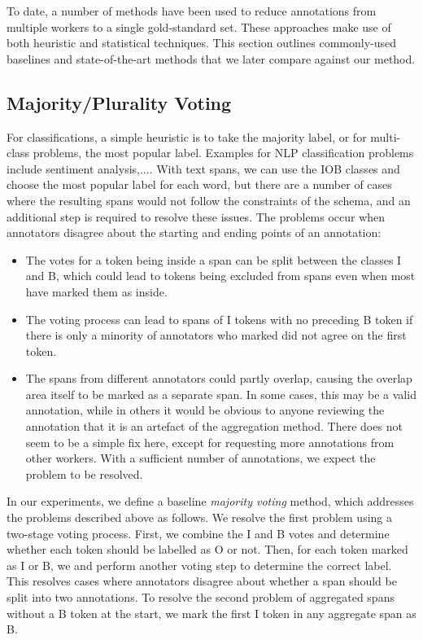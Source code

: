 To date, a number of methods have been used to reduce annotations from multiple workers to a single gold-standard set. These approaches make use of both heuristic and statistical techniques. This section outlines commonly-used baselines and state-of-the-art methods that we later compare against our method.

\subsection{Majority/Plurality Voting}

For classifications, a simple heuristic is to take the majority label, or for multi-class problems, the most popular label. Examples for NLP classification problems include sentiment analysis\cite{sayeed2011crowdsourcing},.... With text spans, we can use the IOB classes and choose the most popular label for each word, but there are a number of cases where the resulting spans would not follow the constraints of the schema, and an additional step is required to resolve these issues. The problems occur when annotators disagree about the starting and ending points of an annotation:
\begin{itemize}
  \item The votes for a token being inside a span can be split between the classes I and B, which could lead to tokens being excluded from spans even when most have marked them as inside. 
  \item The voting process can lead to spans of I tokens with no preceding B token if there is only a minority of annotators who marked did not agree on the first token. 
  \item The spans from different annotators could partly overlap, causing the overlap area itself to be marked as a separate span. In some cases, this may be a valid annotation, while in others it would be obvious to anyone reviewing the annotation that it is an artefact of the aggregation method. There does not seem to be a simple fix here, except for requesting more annotations from other workers. With a sufficient number of annotations, we expect the problem to be resolved.
\end{itemize}
In our experiments, we define a baseline \emph{majority voting} method, which addresses the problems described above as follows. We resolve the first problem using a two-stage voting process. First, we combine the I and B votes and determine whether each token should be labelled as O or not. Then, for each token marked as I or B, we and perform another voting step to determine the correct label. This resolves cases where annotators disagree about whether a span should be split into two annotations. To resolve the second problem of aggregated spans without a B token at the start, we mark the first I token in any aggregate span as B.  

